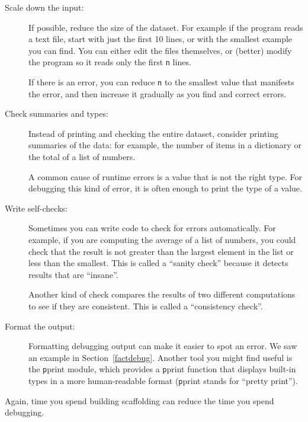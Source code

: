 \documentclass[
DIV=11,
fontsize=13,
twoside,
headinclude=false,
titlepage=firstiscover,
abstract=true,
headsepline=true,
footsepline=true,
chapterprefix=true, %
headings=big,
bibliography=totoc,%
captions=tableheading
]{scrbook}
\theoremstyle{definition}
\begin{document}
\begin{description}

\item[Scale down the input:] If possible, reduce the size of the
dataset.  For example if the program reads a text file, start with
just the first 10 lines, or with the smallest example you can find.
You can either edit the files themselves, or (better) modify the
program so it reads only the first {\texttt n} lines.

If there is an error, you can reduce {\texttt n} to the smallest
value that manifests the error, and then increase it gradually
as you find and correct errors.

\item[Check summaries and types:] Instead of printing and checking the
entire dataset, consider printing summaries of the data: for example,
the number of items in a dictionary or the total of a list of numbers.

A common cause of runtime errors is a value that is not the right
type.  For debugging this kind of error, it is often enough to print
the type of a value.

\item[Write self-checks:]  Sometimes you can write code to check
for errors automatically.  For example, if you are computing the
average of a list of numbers, you could check that the result is
not greater than the largest element in the list or less than
the smallest.  This is called a ``sanity check'' because it detects
results that are ``insane''.

Another kind of check compares the results of two different
computations to see if they are consistent.  This is called a
``consistency check''.

\item[Format the output:] Formatting debugging output
can make it easier to spot an error.  We saw an example in
Section~\ref{factdebug}.  Another tool you might find useful is the {\texttt pprint} module, which provides
a {\texttt pprint} function that displays built-in types in
a more human-readable format ({\texttt pprint} stands for
``pretty print'').

\end{description}

Again, time you spend building scaffolding can reduce
the time you spend debugging.
\end{document}
